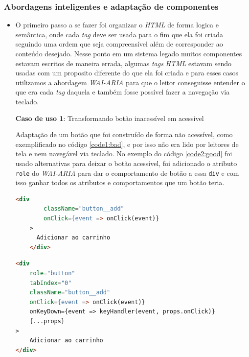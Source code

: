 \subsubsection{Abordagens inteligentes e adaptação de componentes}
{\begin{itemize}
    \item O primeiro passo a se fazer foi organizar o \textit{HTML} \cite{HTML} de forma logica e semântica, onde cada \textit{tag} deve ser usada para o fim que ela foi criada seguindo uma ordem que seja compreensível além de corresponder ao conteúdo desejado. Nesse ponto em um sistema legado muitos componentes estavam escritos de maneira errada, algumas \textit{tags} \textit{HTML} \cite{HTML} estavam sendo usadas com um proposito diferente do que ela foi criada e para esses casos utilizamos a abordagem \textit{WAI-ARIA} \cite{WAI-ARIA} para que o leitor conseguisse entender o que era cada \textit{tag} daquela e também fosse possível fazer a navegação via teclado.

\vspace{1.5cm}
{\centerline{\textbf{Caso de uso 1}: Transformando botão inacessível em acessível} 
Adaptação de um botão que foi construído de forma não acessível, como exemplificado no código \ref{code1:bad},  e por isso não era lido por leitores de tela e nem navegável via teclado. No exemplo do código \ref{code2:good} foi usado alternativas para deixar o botão acessível, foi adicionado o atributo \lstinline{role} do \textit{WAI-ARIA}\cite{WAI-ARIA} para dar o comportamento de botão a essa \lstinline{div} e com isso ganhar todos os atributos e comportamentos que um botão teria.

\begin{lstlisting}[language=html,caption={Componente de botão antes de receber boas praticas e acessibilidade.},  label=code1:bad]
    <div
        className="button__add"
        onClick={event => onClick(event)}
    >
      Adicionar ao carrinho 
    </div>

\end{lstlisting}}
{\begin{lstlisting}[language=html,caption={Adaptação do componente de botão usando o atributo \textit{role} presente no \textit{WAI-ARIA} \cite{WAI-ARIA}.}, label=code2:good]
<div 
    role="button" 
    tabIndex="0" 
    className="button__add"
    onClick={event => onClick(event)}
    onKeyDown={event => keyHandler(event, props.onClick)}
    {...props}
>
    Adicionar ao carrinho
</div>
 
\end{lstlisting}}


\end{itemize}}
